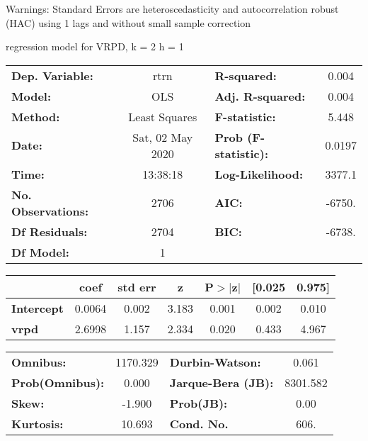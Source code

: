 Warnings: \newline
 [1] Standard Errors are heteroscedasticity and autocorrelation robust (HAC) using 1 lags and without small sample correction\ 

regression model for VRPD, k = 2 h = 1\begin{center}
\begin{tabular}{lclc}
\toprule
\textbf{Dep. Variable:}    &       rtrn       & \textbf{  R-squared:         } &     0.004   \\
\textbf{Model:}            &       OLS        & \textbf{  Adj. R-squared:    } &     0.004   \\
\textbf{Method:}           &  Least Squares   & \textbf{  F-statistic:       } &     5.448   \\
\textbf{Date:}             & Sat, 02 May 2020 & \textbf{  Prob (F-statistic):} &   0.0197    \\
\textbf{Time:}             &     13:38:18     & \textbf{  Log-Likelihood:    } &    3377.1   \\
\textbf{No. Observations:} &        2706      & \textbf{  AIC:               } &    -6750.   \\
\textbf{Df Residuals:}     &        2704      & \textbf{  BIC:               } &    -6738.   \\
\textbf{Df Model:}         &           1      & \textbf{                     } &             \\
\bottomrule
\end{tabular}
\begin{tabular}{lcccccc}
                   & \textbf{coef} & \textbf{std err} & \textbf{z} & \textbf{P$> |$z$|$} & \textbf{[0.025} & \textbf{0.975]}  \\
\midrule
\textbf{Intercept} &       0.0064  &        0.002     &     3.183  &         0.001        &        0.002    &        0.010     \\
\textbf{vrpd}      &       2.6998  &        1.157     &     2.334  &         0.020        &        0.433    &        4.967     \\
\bottomrule
\end{tabular}
\begin{tabular}{lclc}
\textbf{Omnibus:}       & 1170.329 & \textbf{  Durbin-Watson:     } &    0.061  \\
\textbf{Prob(Omnibus):} &   0.000  & \textbf{  Jarque-Bera (JB):  } & 8301.582  \\
\textbf{Skew:}          &  -1.900  & \textbf{  Prob(JB):          } &     0.00  \\
\textbf{Kurtosis:}      &  10.693  & \textbf{  Cond. No.          } &     606.  \\
\bottomrule
\end{tabular}
\end{center}


